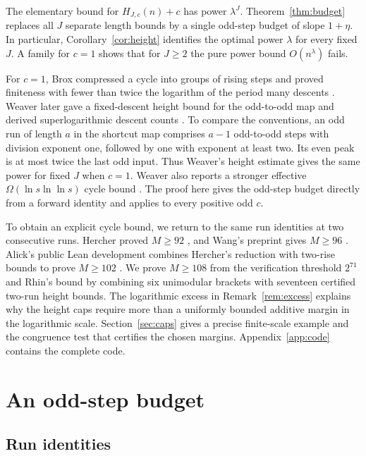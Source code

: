 \documentclass[11pt]{article}
\theoremstyle{definition}
\begin{document}
The elementary bound for \(H_{J,c}(n)+c\) has power \(\lambda^J\).
Theorem~\ref{thm:budget} replaces all \(J\) separate length bounds by
a single odd-step budget of slope \(1+\eta\). In particular,
Corollary~\ref{cor:height} identifies the optimal power \(\lambda\)
for every fixed \(J\). A family for \(c=1\) shows that for \(J\ge2\)
the pure power bound \(O(n^\lambda)\) fails.

For \(c=1\), Brox compressed a cycle into groups of rising steps
and proved finiteness with fewer than twice the logarithm of the
period many descents \cite{Brox}. Weaver later gave a fixed-descent
height bound for the odd-to-odd map and derived superlogarithmic
descent counts \cite{Weaver}. To compare the conventions, an odd run
of length \(a\) in the shortcut map comprises \(a-1\) odd-to-odd
steps with division exponent one, followed by one with exponent
at least two. Its even peak is at most twice the last odd input.
Thus Weaver's height estimate gives the same power for fixed
\(J\) when \(c=1\). Weaver also reports a stronger effective
\(\Omega(\ln s\ln\ln s)\) cycle bound \cite{Weaver}.
The proof here gives the odd-step budget directly from a forward
identity and applies to every positive odd \(c\).

To obtain an explicit cycle bound, we return to the same run
identities at two consecutive runs. Hercher proved \(M\ge92\)
\cite{Hercher}, and Wang's preprint gives \(M\ge96\) \cite{Wang}.
Alick's public Lean development combines Hercher's reduction with
two-rise bounds to prove \(M\ge102\) \cite{Alick}. We prove
\(M\ge108\) from the verification threshold \(2^{71}\) and Rhin's
bound \cite{Barina,SimonsWeger} by combining six unimodular brackets
with seventeen certified two-run height bounds. The logarithmic
excess in Remark~\ref{rem:excess} explains why the height caps
require more than a uniformly bounded additive margin in the
logarithmic scale. Section~\ref{sec:caps} gives a precise
finite-scale example and the congruence test that certifies the
chosen margins. Appendix~\ref{app:code} contains the complete code.

\section{An odd-step budget}\label{sec:budget}

\subsection{Run identities}
\end{document}
